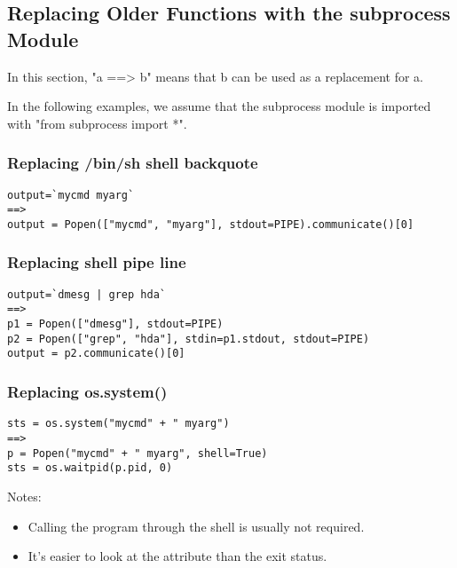\subsection{Replacing Older Functions with the subprocess Module}

In this section, "a ==> b" means that b can be used as a replacement
for a.


In the following examples, we assume that the subprocess module is
imported with "from subprocess import *".

\subsubsection{Replacing /bin/sh shell backquote}

\begin{verbatim}
output=`mycmd myarg`
==>
output = Popen(["mycmd", "myarg"], stdout=PIPE).communicate()[0]
\end{verbatim}

\subsubsection{Replacing shell pipe line}

\begin{verbatim}
output=`dmesg | grep hda`
==>
p1 = Popen(["dmesg"], stdout=PIPE)
p2 = Popen(["grep", "hda"], stdin=p1.stdout, stdout=PIPE)
output = p2.communicate()[0]
\end{verbatim}

\subsubsection{Replacing os.system()}

\begin{verbatim}
sts = os.system("mycmd" + " myarg")
==>
p = Popen("mycmd" + " myarg", shell=True)
sts = os.waitpid(p.pid, 0)
\end{verbatim}

Notes:

\begin{itemize}
\item Calling the program through the shell is usually not required.
\item It's easier to look at the  attribute than
      the exit status.
\end{itemize}

